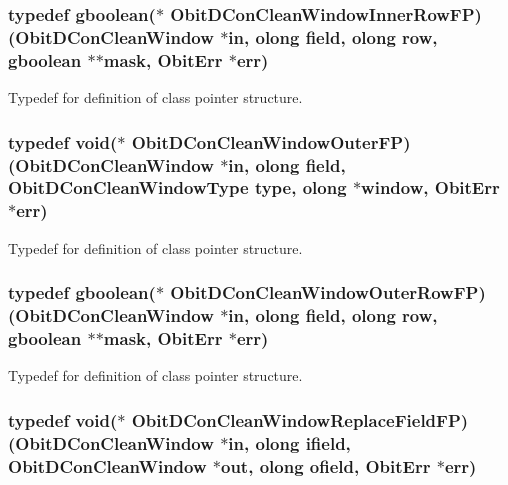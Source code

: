 \subsubsection{\setlength{\rightskip}{0pt plus 5cm}typedef gboolean($\ast$ {\bf Obit\-DCon\-Clean\-Window\-Inner\-Row\-FP})({\bf Obit\-DCon\-Clean\-Window} $\ast$in, {\bf olong} field, {\bf olong} row, gboolean $\ast$$\ast$mask, {\bf Obit\-Err} $\ast$err)}\label{ObitDConCleanWindow_8h_a13}


Typedef for definition of class pointer structure. 

\subsubsection{\setlength{\rightskip}{0pt plus 5cm}typedef void($\ast$ {\bf Obit\-DCon\-Clean\-Window\-Outer\-FP})({\bf Obit\-DCon\-Clean\-Window} $\ast$in, {\bf olong} field, {\bf Obit\-DCon\-Clean\-Window\-Type} type, {\bf olong} $\ast$window, {\bf Obit\-Err} $\ast$err)}\label{ObitDConCleanWindow_8h_a10}


Typedef for definition of class pointer structure. 

\subsubsection{\setlength{\rightskip}{0pt plus 5cm}typedef gboolean($\ast$ {\bf Obit\-DCon\-Clean\-Window\-Outer\-Row\-FP})({\bf Obit\-DCon\-Clean\-Window} $\ast$in, {\bf olong} field, {\bf olong} row, gboolean $\ast$$\ast$mask, {\bf Obit\-Err} $\ast$err)}\label{ObitDConCleanWindow_8h_a15}


Typedef for definition of class pointer structure. 

\subsubsection{\setlength{\rightskip}{0pt plus 5cm}typedef void($\ast$ {\bf Obit\-DCon\-Clean\-Window\-Replace\-Field\-FP})({\bf Obit\-DCon\-Clean\-Window} $\ast$in, {\bf olong} ifield, {\bf Obit\-DCon\-Clean\-Window} $\ast$out, {\bf olong} ofield, {\bf Obit\-Err} $\ast$err)}\label{ObitDConCleanWindow_8h_a19}


